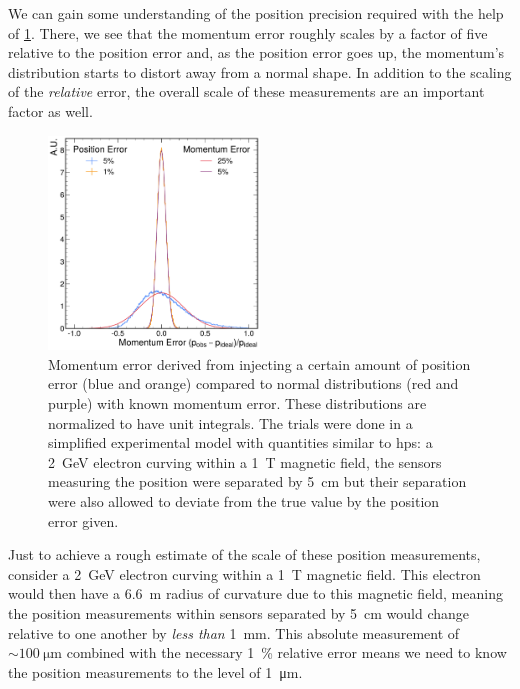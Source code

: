We can gain some understanding of the position precision required with the help of
\cref{fig:momentum-error-from-position-error}. There, we see that the momentum error roughly scales
by a factor of five relative to the position error and, as the position error goes up, the
momentum's distribution starts to distort away from a normal shape. In addition to the scaling of
the \emph{relative} error, the overall scale of these measurements are an important factor as well.

\begin{figure}
  \centering
  \includegraphics[width=0.5\textwidth]{one-offs/position-momentum-uncertainty/momentum-error-from-position-error.pdf}
  \caption{
    Momentum error derived from injecting a certain amount of position error
    (blue and orange) compared to normal distributions (red and purple)
    with known momentum error.
    These distributions are normalized to have unit integrals.
    The trials were done in a simplified experimental model with quantities
    similar to \ac{hps}: a \qty{2}{\giga\electronvolt} electron curving within a
    \qty{1}{\tesla} magnetic field, the sensors measuring the position were
    separated by \qty{5}{\centi\meter} but their separation were also allowed to
    deviate from the true value by the position error given.
  }
  \label{fig:momentum-error-from-position-error}
\end{figure}

Just to achieve a rough estimate of the scale of these position measurements, consider a
\qty{2}{\giga\electronvolt} electron curving within a \qty{1}{\tesla} magnetic field. This electron
would then have a \qty{6.6}{\meter} radius of curvature due to this magnetic field, meaning the
position measurements within sensors separated by \qty{5}{\centi\meter} would change relative to
one another by \emph{less than} \qty{1}{\milli\meter}. This absolute measurement of
$\sim\qty{100}{\micro\meter}$ combined with the necessary \qty{1}{\percent} relative error means we
need to know the position measurements to the level of \qty{1}{\micro\meter}.

